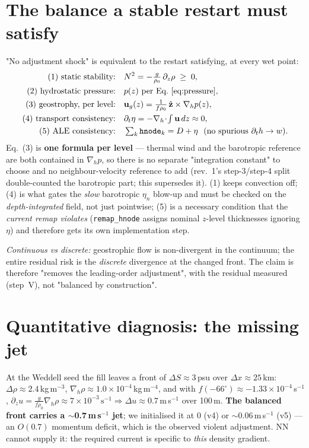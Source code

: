 \documentclass[11pt,a4paper]{article}
\newcommand{\code}[1]{\texttt{#1}}
\newcommand{\uvec}{\mathbf{u}}
\newcommand{\zhat}{\hat{\mathbf{z}}}
\begin{document}
\section{The balance a stable restart must satisfy}\label{sec:balance}
"No adjustment shock" is equivalent to the restart satisfying, at every wet point:
\begin{align}
  \text{(1) static stability:}\quad & N^2 = -\tfrac{g}{\rho_0}\,\partial_z\rho \;\ge\; 0,\\
  \text{(2) hydrostatic pressure:}\quad & p(z)\ \text{per Eq.~\eqref{eq:pressure}},\\
  \text{(3) geostrophy, per level:}\quad & \uvec_g(z) = \tfrac{1}{f\rho_0}\,\zhat\times\nabla_h p(z),\\
  \text{(4) transport consistency:}\quad & \partial_t\eta = -\nabla_h\!\cdot\!\textstyle\int \uvec\,dz \approx 0,\\
  \text{(5) ALE consistency:}\quad & \textstyle\sum_k \code{hnode}_k = D + \eta \ \ (\text{no spurious } \partial_t h\to w).
\end{align}
Eq.~(3) is \textbf{one formula per level} --- thermal wind and the barotropic reference are both
contained in $\nabla_h p$, so there is no separate "integration constant" to choose and no
neighbour-velocity reference to add (rev.~1's step-3/step-4 split double-counted the barotropic
part; this supersedes it). (1) keeps convection off; (4) is what gates the \emph{slow} barotropic
$\eta_n$ blow-up and must be checked on the \emph{depth-integrated} field, not just pointwise; (5)
is a necessary condition that the \emph{current remap violates} (\code{remap\_hnode} assigns
nominal $z$-level thicknesses ignoring $\eta$) and therefore gets its own implementation step.

\emph{Continuous vs discrete:} geostrophic flow is non-divergent in the continuum; the entire
residual risk is the \emph{discrete} divergence at the changed front. The claim is therefore
"removes the leading-order adjustment", with the residual measured (step~V), not "balanced by
construction".

\section{Quantitative diagnosis: the missing jet}\label{sec:jet}
At the Weddell seed the fill leaves a front of $\Delta S\approx3$\,psu over $\Delta x\approx25$\,km:
$\Delta\rho\approx2.4$\,kg\,m$^{-3}$, $\nabla_h\rho\approx1.0\times10^{-4}$\,kg\,m$^{-4}$, and with
$f(-66^\circ)\approx-1.33\times10^{-4}$\,s$^{-1}$,
$\partial_z u = \tfrac{g}{f\rho_0}\nabla_h\rho \approx 7\times10^{-3}\,\text{s}^{-1}
\Rightarrow \Delta u \approx 0.7$\,m\,s$^{-1}$ over 100\,m.
\textbf{The balanced front carries a $\sim$0.7\,m\,s$^{-1}$ jet}; we initialised it at $0$ (v4) or
$\sim$0.06\,m\,s$^{-1}$ (v5) --- an $O(0.7)$ momentum deficit, which is the observed violent
adjustment. NN cannot supply it: the required current is specific to \emph{this} density gradient.
\end{document}

